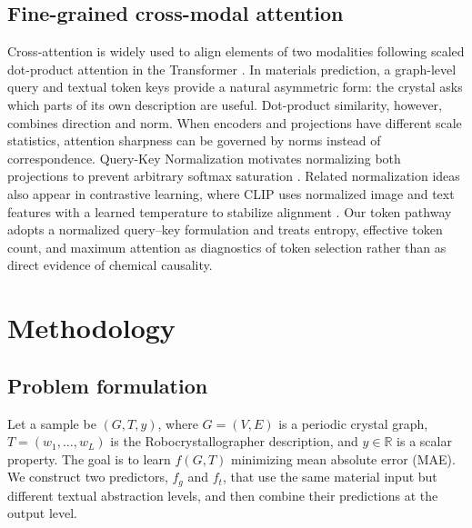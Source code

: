 \documentclass[a4paper,fleqn]{cas-sc}
\begin{document}
\subsection{Fine-grained cross-modal attention}
Cross-attention is widely used to align elements of two modalities following scaled dot-product attention in the Transformer \citep{vaswani2017attention}. In materials prediction, a graph-level query and textual token keys provide a natural asymmetric form: the crystal asks which parts of its own description are useful. Dot-product similarity, however, combines direction and norm. When encoders and projections have different scale statistics, attention sharpness can be governed by norms instead of correspondence. Query-Key Normalization motivates normalizing both projections to prevent arbitrary softmax saturation \citep{henry2020qknorm}. Related normalization ideas also appear in contrastive learning, where CLIP uses normalized image and text features with a learned temperature to stabilize alignment \citep{radford2021clip}. Our token pathway adopts a normalized query--key formulation and treats entropy, effective token count, and maximum attention as diagnostics of token selection rather than as direct evidence of chemical causality.

\section{Methodology}
\subsection{Problem formulation}
Let a sample be $(G,T,y)$, where $G=(V,E)$ is a periodic crystal graph, $T=(w_1,\ldots,w_L)$ is the Robocrystallographer description, and $y\in\mathbb{R}$ is a scalar property. The goal is to learn $f(G,T)$ minimizing mean absolute error (MAE). We construct two predictors, $f_g$ and $f_t$, that use the same material input but different textual abstraction levels, and then combine their predictions at the output level.
\end{document}
